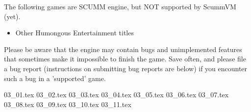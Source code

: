 \begin{itemize}
  The following games are SCUMM engine, but NOT supported by ScummVM (yet).
  \begin{itemize}
  \item Other Humongous Entertainment titles
  \end{itemize}
%
Please be aware that the engine may contain bugs and unimplemented features
that sometimes make it impossible to finish the game. Save often, and please
file a bug report (instructions on submitting bug reports are below) if you
encounter such a bug in a 'supported' game.
\end{itemize}
 {03_01.tex}
 {03_02.tex}
 {03_03.tex}
 {03_04.tex}
 {03_05.tex}
 {03_06.tex}
 {03_07.tex}
 {03_08.tex}
 {03_09.tex}
 {03_10.tex}
 {03_11.tex}
